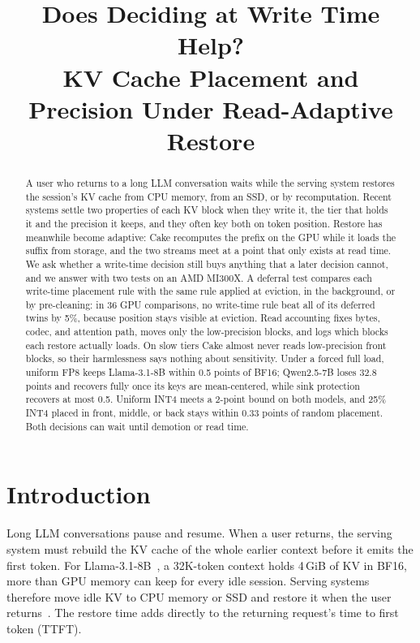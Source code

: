 \documentclass[conference]{IEEEtran}
\begin{document}
\title{Does Deciding at Write Time Help?\\
KV Cache Placement and Precision Under Read-Adaptive Restore}

\author{
}

\maketitle

\begin{abstract}
A user who returns to a long LLM conversation waits while the serving system restores the session's KV cache from CPU memory, from an SSD, or by recomputation.
Recent systems settle two properties of each KV block when they write it, the tier that holds it and the precision it keeps, and they often key both on token position.
Restore has meanwhile become adaptive: Cake recomputes the prefix on the GPU while it loads the suffix from storage, and the two streams meet at a point that only exists at read time.
We ask whether a write-time decision still buys anything that a later decision cannot, and we answer with two tests on an AMD MI300X.
A deferral test compares each write-time placement rule with the same rule applied at eviction, in the background, or by pre-cleaning: in 36 GPU comparisons, no write-time rule beat all of its deferred twins by 5\%, because position stays visible at eviction.
Read accounting fixes bytes, codec, and attention path, moves only the low-precision blocks, and logs which blocks each restore actually loads.
On slow tiers Cake almost never reads low-precision front blocks, so their harmlessness says nothing about sensitivity.
Under a forced full load, uniform FP8 keeps Llama-3.1-8B within 0.5 points of BF16; Qwen2.5-7B loses 32.8 points and recovers fully once its keys are mean-centered, while sink protection recovers at most 0.5.
Uniform INT4 meets a 2-point bound on both models, and 25\% INT4 placed in front, middle, or back stays within 0.33 points of random placement.
Both decisions can wait until demotion or read time.
\end{abstract}

\section{Introduction}\label{sec:intro}
Long LLM conversations pause and resume.
When a user returns, the serving system must rebuild the KV cache of the whole earlier context before it emits the first token.
For Llama-3.1-8B~\cite{llama3_2024}, a 32K-token context holds 4\,GiB of KV in BF16, more than GPU memory can keep for every idle session.
Serving systems therefore move idle KV to CPU memory or SSD and restore it when the user returns~\cite{cachedattention2024,pensieve2025,mooncake2025,lmcache2025}.
The restore time adds directly to the returning request's time to first token (TTFT).
\end{document}
